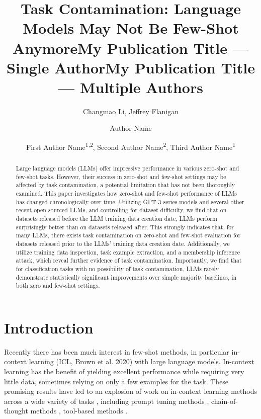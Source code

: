 \documentclass[letterpaper]{article} %
\title{Task Contamination: Language Models May Not Be Few-Shot Anymore}
\author {
    Changmao Li,
    Jeffrey Flanigan
}
\title{My Publication Title --- Single Author}
\author {
    Author Name
}
\title{My Publication Title --- Multiple Authors}
\author {
    First Author Name\textsuperscript{\rm 1,\rm 2},
    Second Author Name\textsuperscript{\rm 2},
    Third Author Name\textsuperscript{\rm 1}
}
\newcommand{\nilay}[1]{}
\newcommand{\jmf}[1]{}      %
\begin{document}
\maketitle


\begin{abstract}
Large language models (LLMs) offer impressive performance in various zero-shot and few-shot tasks. However, their success in zero-shot and few-shot settings may be affected by task contamination, a potential limitation that has not been thoroughly examined. This paper investigates how zero-shot and few-shot performance of LLMs has changed chronologically over time. Utilizing GPT-3 series models and several other recent open-sourced LLMs, and controlling for dataset difficulty, we find that on datasets released before the LLM training data creation date, LLMs perform surprisingly better than on datasets released after. This strongly indicates that, for many LLMs, there exists task contamination on zero-shot and few-shot evaluation for datasets released prior to the LLMs' training data creation date. Additionally, we utilize training data inspection, task example extraction, and a membership inference attack, which reveal further evidence of task contamination. Importantly, we find that for classification tasks with no possibility of task contamination, LLMs rarely demonstrate statistically significant improvements over simple majority baselines, in both zero and few-shot settings.
\end{abstract}


\section{Introduction}

Recently there has been much interest in few-shot methods, in particular in-context learning (ICL, Brown et al. 2020) with large language models.  In-context learning has the benefit of yielding excellent performance while requiring very little data, sometimes relying on only a few examples for the task\nilay{maybe change 'few' to '< 10' to give concrete number?}.  These promising results have led to an explosion of work on in-context learning methods across a wide variety of tasks \cite{schick-schutze-2021a, schick-schutze-2021b, poesia2022, hu-etal-2022},\jmf{shorten to just the highlights, 3-4 citations} including prompt tuning methods \cite{qin2021, lester2021}, chain-of-thought methods \cite{wei2022, wang2022, wang2023, aiyappa2023}, tool-based methods \cite{Timo2023, yang2023}.
\end{document}
